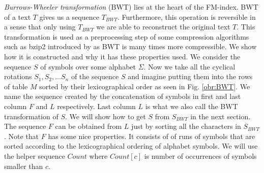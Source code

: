 \textit{Burrows-Wheeler transformation} (BWT) lies at the heart of the FM-index.
BWT of a text $T$ gives us a sequence $T_{BWT}$. Furthermore, this
operation is reversible in a sense that only using $T_{BWT}$ we are able to reconstruct the
original text $T$. This transformation is used as a preprocessing step of some compression
algorithms such as bzip2 introduced by \cite{seward1996bzip2} as BWT is many times more
compressible. We show how it is constructed and why it has these properties used. We consider
the sequence $S$ of symbols over
some alphabet $\Sigma$. Now we take all the cyclical rotations $S_1, S_2, \ldots S_n$ of the
sequence $S$ and imagine putting them into the rows of table $M$ sorted by their lexicographical
order as seen in Fig. \ref{obr:BWT}. We name the sequence created by the concatenation of symbols
in first and last column $F$ and $L$ respectively. Last column $L$ is what we also call
the BWT transformation of $S$. We will show how to get $S$ from $S_{BWT}$ in the next section. The sequence $F$ can
be obtained from $L$ just by sorting all the characters in $S_{BWT}$. Note that $F$ has some
nice properties. It consists of of runs of symbols that are sorted according to the lexicographical
ordering of alphabet symbols. We will use the helper sequence $Count$ where $Count[c]$ is
number of occurrences of symbols smaller than $c$.

